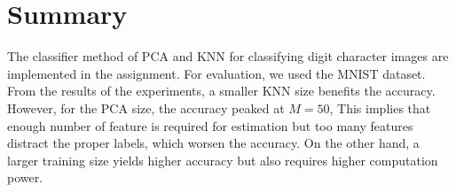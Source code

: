 \documentclass[conference]{IEEEtran}
\begin{document}
\section{Summary} %
The classifier method of PCA and KNN for classifying digit character images are implemented in the assignment. For evaluation, we used the MNIST dataset. From the results of the experiments, a smaller KNN size benefits the accuracy. However, for the PCA size, the accuracy peaked at $M=50$, This implies that enough number of feature is required for estimation but too many features distract the proper labels, which worsen the accuracy. On the other hand, a larger training size yields higher accuracy but also requires higher computation power.







\end{document}
